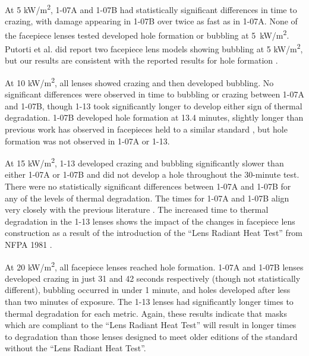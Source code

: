 \documentclass[sn-mathphys]{sn-jnl}%
\theoremstyle{thmstyleone}%
\theoremstyle{thmstyletwo}%
\theoremstyle{thmstylethree}%
\begin{document}
At 5 kW/m\textsuperscript{2}, 1-07A and 1-07B had statistically significant differences in time to crazing, with damage appearing in 1-07B over twice as fast as in 1-07A. None of the facepiece lenses tested developed hole formation or bubbling at \mbox{5 kW/m\textsuperscript{2}}. Putorti et al. did report two facepiece lens models showing bubbling at 5 kW/m\textsuperscript{2}, but our results are consistent with the reported results for hole formation \cite{putorti_thermal_2013}. 

At 10 kW/m\textsuperscript{2}, all lenses showed crazing and then developed bubbling. No significant differences were observed in time to bubbling or crazing between 1-07A and 1-07B, though 1-13 took significantly longer to develop either sign of thermal degradation. 1-07B developed hole formation at 13.4 minutes, slightly longer than previous work has observed in facepieces held to a similar standard \cite{putorti_thermal_2013}, but hole formation was not observed in 1-07A or 1-13.

At 15 kW/m\textsuperscript{2}, 1-13 developed crazing and bubbling significantly slower than either 1-07A or 1-07B and did not develop a hole throughout the 30-minute test. There were no statistically significant differences between 1-07A and 1-07B for any of the levels of thermal degradation. The times for 1-07A and 1-07B align very closely with the previous literature \cite{putorti_thermal_2013}. The increased time to thermal degradation in the 1-13 lenses shows the impact of the changes in facepiece lens construction as a result of the introduction of the “Lens Radiant Heat Test” from NFPA 1981 \cite{national_fire_protection_association_nfpa_2013}.

At 20 kW/m\textsuperscript{2}, all facepiece lenses reached hole formation. 1-07A and 1-07B lenses developed crazing in just 31 and 42 seconds respectively (though not statistically different), bubbling occurred in under 1 minute, and holes developed after less than two minutes of exposure. The 1-13 lenses had significantly longer times to thermal degradation for each metric. Again, these results indicate that masks which are compliant to the “Lens Radiant Heat Test” will result in longer times to degradation than those lenses designed to meet older editions of the standard without the “Lens Radiant Heat Test”.
\end{document}
